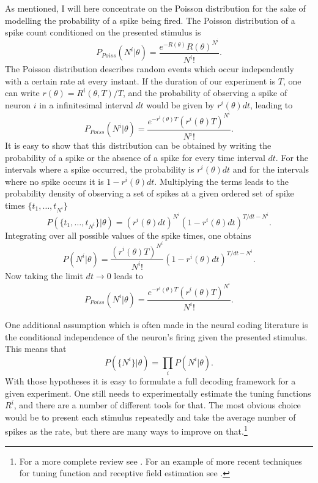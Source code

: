 As mentioned, I will here concentrate on the Poisson distribution for the sake of modelling the probability of a spike being fired. The Poisson distribution of a spike count conditioned
on the presented stimulus is
\[
P_{Poiss}(N^i|\theta) = \frac{e^{-R(\theta)} R(\theta)^{N^i}}{N^i!}.
\]
The Poisson distribution describes random events which occur independently with a certain rate at every instant. If the duration of our experiment is $T$, one can write
$r(\theta) = R^i(\theta,T)/T$, and the probability of observing a spike of neuron $i$ in a infinitesimal interval $dt$ would be given by $r^i(\theta)dt$, leading to
\[
P_{Poiss}(N^i|\theta) = \frac{e^{-r^i(\theta)T} \left(r^i(\theta)T\right)^{N^i}}{N^i!}.
\]
It is easy to show that this distribution can be obtained by writing the probability of a spike or the absence of a spike for every time interval $dt$. For the intervals
where a spike occurred, the probability is $r^i(\theta)dt$ and for the intervals where no spike occurs it is $1-r^i(\theta)dt$.
Multiplying the terms leads to the probability density of observing a set 
of spikes at a given ordered set of spike times $\{t_1,\ldots,t_{N^i}\}$
\[
P(\{t_1,\ldots,t_{N^i}\}|\theta) = (r^i(\theta) dt)^{N^i}  (1-r^i(\theta)dt)^{T/dt-N^i}.
\]
Integrating over all possible values of the spike times, one obtains
\[
P(N^i|\theta) = \frac{(r^i(\theta) T)^{N^i}}{N^i!} (1-r^i(\theta)dt)^{T/dt-N^i}.
\]
Now taking the limit $dt \to 0$ leads to
\[
P_{Poiss}(N^i|\theta) = \frac{e^{-r^i(\theta)T} \left(r^i(\theta)T\right)^{N^i}}{N^i!}.
\]\par
One additional assumption which is often made in the neural coding literature is the conditional independence of the neuron's firing given the presented stimulus. This
means that
\[
P(\{N^i\}|\theta) = \prod_i P(N^i|\theta).
\]
With those hypotheses it is easy to formulate a full decoding framework for a given experiment. One still needs to experimentally estimate the tuning functions $R^i$,
and there are a number of different tools for that. The most obvious choice would be to present each stimulus repeatedly and take the average number of spikes as the
rate, but there are many ways to improve on that.\footnote{For a more complete review see . For an example of more recent techniques for tuning function and receptive field estimation see .}\par
%
\par


